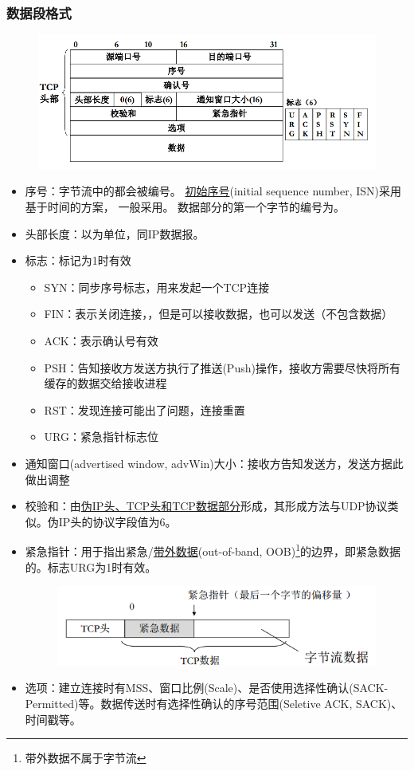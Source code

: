 \subsubsection{数据段格式}
\begin{figure}[H]
    \centering
    \includegraphics[width=0.8\linewidth]{fig/tcp_format.png}
\end{figure}
\begin{itemize}
    \item 序号：字节流中的都会被编号。
    \underline{初始序号}(initial sequence number, ISN)采用基于时间的方案， 一般采用。
    数据部分的第一个字节的编号为。
    \item 头部长度：以为单位，同IP数据报。
    \item 标志：标记为1时有效
\begin{itemize}
\item SYN：同步序号标志，用来发起一个TCP连接
\item FIN：表示关闭连接，，但是可以接收数据，也可以发送（不包含数据）
\item ACK：表示确认号有效
\item PSH：告知接收方发送方执行了推送(Push)操作，接收方需要尽快将所有缓存的数据交给接收进程
\item RST：发现连接可能出了问题，连接重置
\item URG：紧急指针标志位
\end{itemize}
    \item 通知窗口(advertised window, advWin)大小：接收方告知发送方，发送方据此做出调整
    \item 校验和：由\underline{伪IP头、TCP头和TCP数据部分}形成，其形成方法与UDP协议类似。伪IP头的协议字段值为6。
    \item 紧急指针：用于指出紧急/\underline{带外数据}(out-of-band, OOB)\footnote{带外数据不属于字节流}的边界，即紧急数据的。标志URG为1时有效。
    \begin{figure}[H]
        \centering
        \includegraphics[width=0.5\linewidth]{fig/out-of-band.png}
    \end{figure}
    \item 选项：建立连接时有MSS、窗口比例(Scale)、是否使用选择性确认(SACK-Permitted)等。数据传送时有选择性确认的序号范围(Seletive ACK, SACK)、时间戳等。
\end{itemize}

